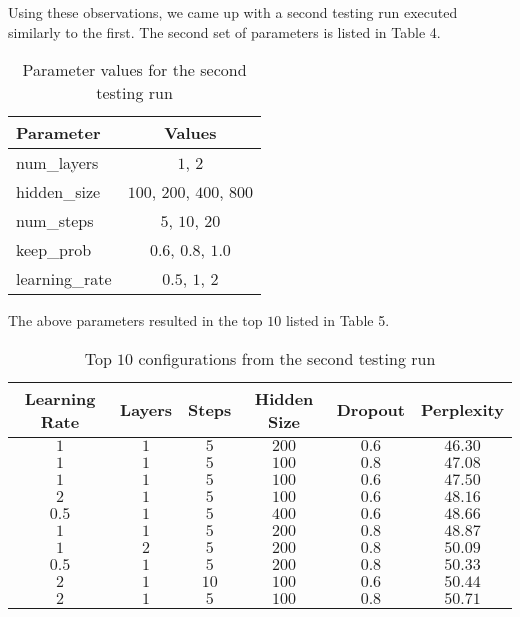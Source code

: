 \documentclass[a4paper]{article}
\begin{document}
Using these observations, we came up with a second testing run executed
similarly to the first. The second set of parameters is listed in Table 4.

\begin{table}[h]
 \caption{Parameter values for the second testing run}
 \label{table}
 \begin{center}
  \begin{tabular}{l|c}
    \hline \hline
    Parameter & Values \\
    \hline
        num\_layers & $1$, $2$ \\
        hidden\_size & $100$, $200$, $400$, $800$ \\
        num\_steps & $5$, $10$, $20$ \\
        keep\_prob & $0.6$, $0.8$, $1.0$ \\
        learning\_rate & $0.5$, $1$, $2$ \\
    \hline
  \end{tabular}
 \end{center}
\end{table}

The above parameters resulted in the top $10$ listed in Table 5.


\begin{table}[h]
 \caption{Top $10$ configurations from the second testing run}
 \label{table}
 \begin{center}
  \begin{tabular}{ccccc|c}
    \hline \hline
    Learning Rate & Layers & Steps & Hidden Size & Dropout & Perplexity \\
    \hline
        $1$ & $1$ & $5$ & $200$ & $0.6$ & $46.30$ \\
        $1$ & $1$ & $5$ & $100$ & $0.8$ & $47.08$ \\
        $1$ & $1$ & $5$ & $100$ & $0.6$ & $47.50$ \\
        $2$ & $1$ & $5$ & $100$ & $0.6$ & $48.16$ \\
        $0.5$ & $1$ & $5$ & $400$ & $0.6$ & $48.66$ \\
        $1$ & $1$ & $5$ & $200$ & $0.8$ & $48.87$ \\
        $1$ & $2$ & $5$ & $200$ & $0.8$ & $50.09$ \\
        $0.5$ & $1$ & $5$ & $200$ & $0.8$ & $50.33$ \\
        $2$ & $1$ & $10$ & $100$ & $0.6$ & $50.44$ \\
        $2$ & $1$ & $5$ & $100$ & $0.8$ & $50.71$ \\
    \hline
  \end{tabular}
 \end{center}
\end{table}
\end{document}
